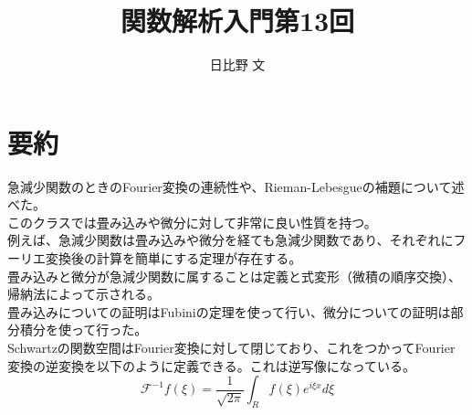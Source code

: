 \documentclass[12pt,a4paper]{ltjsarticle}
\begin{document}
\title{関数解析入門第13回}
\author{日比野 文}
\maketitle

\section{要約}
急減少関数のときのFourier変換の連続性や、Rieman-Lebesgueの補題について述べた。\\
このクラスでは畳み込みや微分に対して非常に良い性質を持つ。\\
例えば、急減少関数は畳み込みや微分を経ても急減少関数であり、それぞれにフーリエ変換後の計算を簡単にする定理が存在する。\\
畳み込みと微分が急減少関数に属することは定義と式変形（微積の順序交換）、帰納法によって示される。\\
畳み込みについての証明はFubiniの定理を使って行い、微分についての証明は部分積分を使って行った。\\
Schwartzの関数空間はFourier変換に対して閉じており、これをつかってFourier変換の逆変換を以下のように定義できる。これは逆写像になっている。\\
$$
\mathcal{F}^{-1}f(\xi)=\frac{1}{\sqrt{2\pi}}\int_R f(\xi)e^{i\xi x}d\xi
$$
\end{document}
